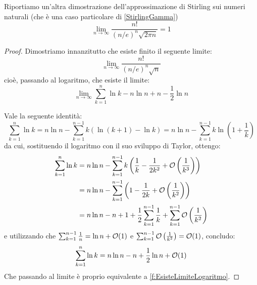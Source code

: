 \begin{theorem}\label{f:StirlingNaturali}
	Riportiamo un'altra dimostrazione dell'approssimazione di Stirling sui numeri naturali (che è una caso
	particolare di \cref{StirlingGamma})
	\begin{equation*}
		\lim_{n\to\infty}{\frac{n!}{(n/e)^n\sqrt{2\pi n}}}=1
	\end{equation*}
\end{theorem}
\begin{proof}
	Dimostriamo innanzitutto che esiste finito il seguente limite:
	\begin{equation}\label{f:EsisteLimite}
		\lim_{n\to\infty}{\frac{n!}{(n/e)^n\sqrt{n}}}
	\end{equation}
	cioè, passando al logaritmo, che esiste il limite:
	\begin{equation}\label{f:EsisteLimiteLogaritmo}
		\lim_{n\to\infty}{\sum_{k=1}^{n}\ln k-n\ln n+n-\frac{1}{2}\ln n}
	\end{equation}
	
	Vale la seguente identità:
	\begin{equation*}
		\sum_{k=1}^{n}\ln k=n\ln n-\sum_{k=1}^{n-1}{k\left(\ln(k+1)-\ln k \right)}=n\ln n-\sum_{k=1}^{n-1}{k\ln\left(1+\frac{1}{k}\right)}
	\end{equation*}
	da cui, sostituendo il logaritmo con il suo sviluppo di Taylor, ottengo:
	\begin{equation*}
	\begin{split}
		\sum_{k=1}^{n}\ln k	& =n\ln n-\sum_{k=1}^{n-1}{k\left(\frac{1}{k}-\frac{1}{2k^2}+\mathcal{O}\left(\frac{1}{k^3}\right) \right)}\\
							& =n\ln n-\sum_{k=1}^{n-1}\left(1-\frac{1}{2k}+\mathcal{O}\left(\frac{1}{k^2}\right)  \right)\\
							& =n\ln n-n+1+\frac{1}{2}\sum_{k=1}^{n-1}\frac{1}{k}+\sum_{k=1}^{n-1}\mathcal{O}\left(\frac{1}{k^2}\right)
	\end{split}
	\end{equation*}
	e utilizzando che $\sum_{k=1}^{n-1}\frac{1}{n}=\ln n+\mathcal{O}(1)$ e 
	$\sum_{k=1}^{n-1}\mathcal{O}\left(\frac{1}{k^2}\right)=\mathcal{O}(1)$, concludo:
	\begin{equation}\label{f:QuasiStirlingNaturali}
		\sum_{k=1}^{n}\ln k=n\ln n-n+\frac{1}{2}\ln n + \mathcal{O}(1)
	\end{equation}
	Che passando al limite è proprio equivalente a \cref{f:EsisteLimiteLogaritmo}.
	

\end{proof}
